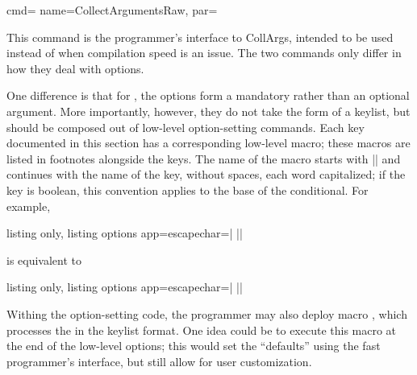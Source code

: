 \documentclass[a4paper,11pt]{article}
\begin{document}
\begin{doc}{cmd={
      name=CollectArgumentsRaw,
      par=%
      \textcolor{gray}{}}}
    
  This command is the programmer's interface to CollArgs, intended to be used
  instead of  when compilation speed is an issue.  The
  two commands only differ in how they deal with options.

  One difference is that for , the options form a
  mandatory rather than an optional argument.  More importantly, however, they
  do not take the form of a keylist, but should be composed out of low-level
  option-setting commands.  Each key documented in this section has a
  corresponding low-level macro; these macros are listed in footnotes alongside
  the keys.  The name of the macro starts with |\collargs| and continues with
  the name of the key, without spaces, each word capitalized; if the key is
  boolean, this convention applies to the base of the 
  conditional. For example,
  \begin{tcblisting}{listing only, listing options app={escapechar=|}}
\CollectArguments[caller=\foo, tags, verbatim]||
  \end{tcblisting}
  is equivalent to
  \begin{tcblisting}{listing only, listing options app={escapechar=|}}
\CollectArgumentsRaw{%
  \collargsCaller{\foo}%
  \collargsBeginTagtrue\collargsEndTagtrue
  \collargsVerbatim
}||
  \end{tcblisting}
  
  Withing the option-setting code, the programmer may also deploy macro
  , which processes the  in the keylist
  format.  One idea could be to execute this macro at the end of the low-level
  options; this would set the ``defaults'' using the fast programmer's
  interface, but still allow for user customization.
\end{doc}
\end{document}
